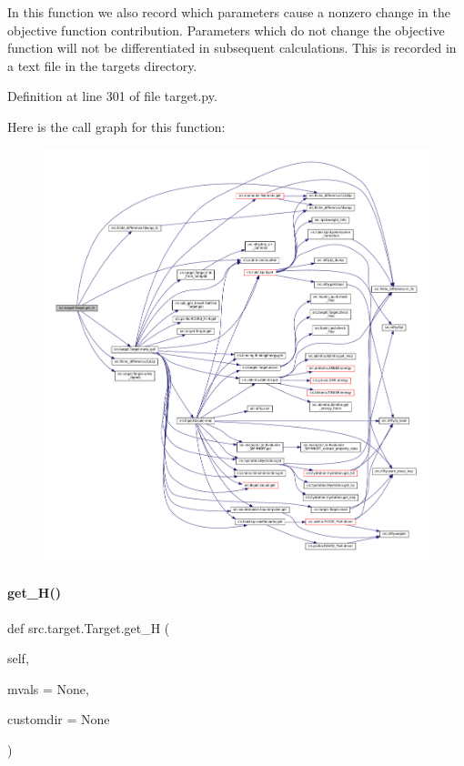 In this function we also record which parameters cause a nonzero change in the objective function contribution. Parameters which do not change the objective function will not be differentiated in subsequent calculations. This is recorded in a text file in the targets directory. 

Definition at line 301 of file target.\+py.

Here is the call graph for this function\+:
\nopagebreak
\begin{figure}[H]
\begin{center}
\leavevmode
\includegraphics[width=350pt]{classsrc_1_1target_1_1Target_abd888e5a08e9858fcf72dbad7133d538_cgraph}
\end{center}
\end{figure}
\mbox{\label{classsrc_1_1target_1_1Target_adae73b394ec5a1c22fe57d90265de537}} 
\paragraph{\texorpdfstring{get\+\_\+\+H()}{get\_H()}}
{\footnotesize\ttfamily def src.\+target.\+Target.\+get\+\_\+H (\begin{DoxyParamCaption}\item[{}]{self,  }\item[{}]{mvals = {\ttfamily None},  }\item[{}]{customdir = {\ttfamily None} }\end{DoxyParamCaption})}



